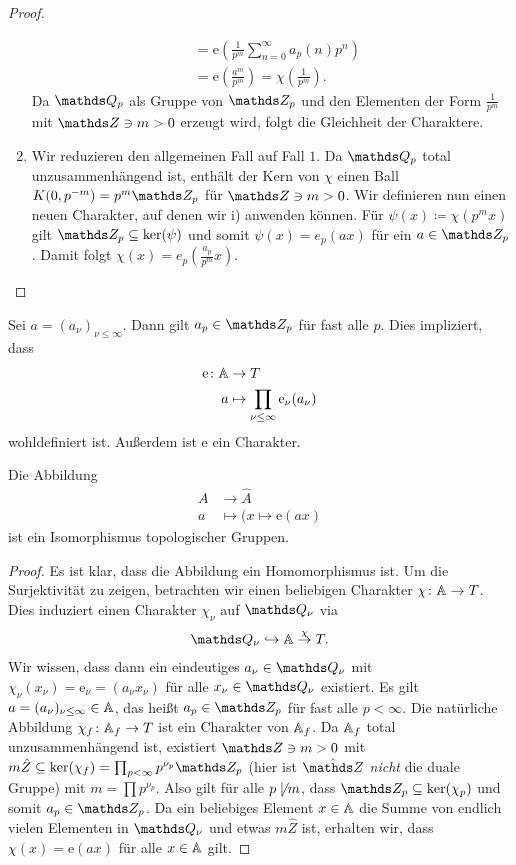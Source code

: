 \begin{proof}
\begin{enumerate}[label=\roman*)]
\begin{align*}
&=\mathrm{e}(\frac{1}{p^m}\sum_{n=0}^\infty a_p(n)p^n)\\
&=\mathrm{e}(\frac{a^m}{p^m})=\chi(\frac{1}{p^m}).
\end{align*}
Da $\Q_p$ als Gruppe von $\Z_p$ und den Elementen der Form $\frac{1}{p^m}$ mit $\Z \ni m>0$ erzeugt wird, folgt die Gleichheit der Charaktere.
\item Wir reduzieren den allgemeinen Fall auf Fall $1$.
Da $\Q_p$ total unzusammenhängend ist, enthält der Kern von $\chi$ einen Ball $K(0,p^{-m})=p^m \Z_p$ für $\Z \ni m>0$.
Wir definieren nun einen neuen Charakter, auf denen wir i) anwenden können.
Für $\psi(x)\coloneqq \chi(p^mx)$ gilt $\Z_p \subseteq \ker(\psi)$ und somit $\psi(x)=e_p(ax)$ für ein $a\in \Z_p$.
Damit folgt $\chi(x)=e_p(\frac{a_p}{p^m}x)$. \qedhere
\end{enumerate}
\end{proof}

Sei $a=(a_\nu)_{\nu \leq \infty}$. Dann gilt $a_p \in \Z_p$ für fast alle $p$.
Dies impliziert, dass
\begin{align*}
\mathrm{e}\colon \mathbb{A} &\to T\\
a &\mapsto \prod_{\nu \leq \infty} \mathrm{e}_\nu(a_\nu) 
\end{align*}
wohldefiniert ist. Außerdem ist $\mathrm{e}$ ein Charakter.

\begin{prop}
Die Abbildung
\begin{align*}
A &\to \hat{A}\\
a&\mapsto (x \mapsto \mathrm{e}(ax)
\end{align*}
ist ein Isomorphismus topologischer Gruppen.
\end{prop}
\begin{proof}
Es ist klar, dass die Abbildung ein Homomorphismus ist.
Um die Surjektivität zu zeigen, betrachten wir einen beliebigen Charakter $\chi \colon \mathbb{A} \to T$.
Dies induziert einen Charakter $\chi_\nu$ auf $\Q_\nu$ via
\begin{align*}
\Q_\nu \hookrightarrow \A \overset{\chi}{\to} T.
\end{align*}
Wir wissen, dass dann ein eindeutiges $a_\nu \in \Q_\nu$ mit $\chi_\nu(x_\nu)=\mathrm{e}_\nu=(a_\nu x_\nu)$ für alle $x_\nu \in \Q_\nu$ existiert.
Es gilt $a=(a_\nu)_{\nu \leq \infty}\in \mathbb{A}$, das heißt $a_p \in \Z_p$ für fast alle $p<\infty$.
Die natürliche Abbildung $\chi_f \colon \mathbb{A}_f \to T$ ist ein Charakter von $\mathbb{A}_f$.
Da $\mathbb{A}_f$ total unzusammenhängend ist, existiert $\Z \ni m >0$ mit
$m \hat{Z} \subseteq \ker(\chi_f)=\prod_{p<\infty} p^{\nu_p} \Z_p$ (hier ist $\hat{\Z}$ \emph{nicht} die duale Gruppe) mit $m=\prod p^{\nu_p}$.
Also gilt für alle $p \not \mid m$, dass $\Z_p \subseteq \ker(\chi_p)$ und somit $a_p \in \Z_p$.
Da ein beliebiges Element $x\in \mathbb{A}$ die Summe von endlich vielen Elementen in $\Q_\nu$ und etwas $m\hat{Z}$ ist, erhalten wir, dass $\chi(x)=\mathrm{e}(ax)$ für alle $x\in \mathbb{A}$ gilt.
\end{proof}

